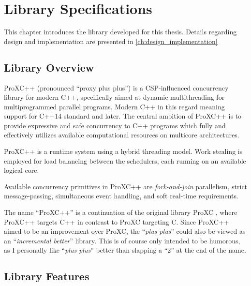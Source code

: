 
\chapter{Library Specifications}
\label{ch:library_specifications}

This chapter introduces the library developed for this thesis. Details regarding design and implementation are presented in \cref{ch:design_implementation}


\section{Library Overview}
\label{sec:library_overview}

ProXC++ (pronounced ``proxy plus plus'') is a CSP\hyp{}influenced concurrency library for modern C++, specifically aimed at dynamic multithreading for multiprogrammed parallel programs. Modern C++ in this regard meaning support for C++14 standard and later. The central ambition of ProXC++ is to provide expressive and safe concurrency to C++ programs which fully and effectively utilizes available computational resources on multicore architectures.

ProXC++ is a runtime system using a hybrid threading model. Work stealing is employed for load balancing between the schedulers, each running on an available logical core. 

Available concurrency primitives in ProXC++ are \textit{fork\hyp{}and\hyp{}join} parallelism, strict message\hyp{}passing, simultaneous event handling, and soft real\hyp{}time requirements.

The name ``ProXC++'' is a continuation of the original library ProXC \citep{pettersen2016proxc}, where ProXC++ targets C++ in contrast to ProXC targeting C. Since ProXC++ aimed to be an improvement over ProXC, the ``\textit{plus plus}'' could also be viewed as an ``\textit{incremental better}'' library. This is of course only intended to be humorous, as I personally like ``\textit{plus plus}'' better than slapping a ``2'' at the end of the name.


\section{Library Features}
\label{sec:library_features}

